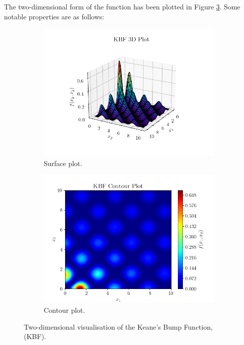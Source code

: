 \documentclass[10pt]{article}
\begin{document}
\begin{multicols}{2}
The two-dimensional form of the function has been plotted in Figure \ref{fig:KBF_2D}. Some notable properties are as follows:

\begin{figure}[H]
    \centering
    \begin{subfigure}{0.49\textwidth}
        \centering
        \includegraphics[width=\textwidth]{../figures/KBF/KBF_surf.png}
        \caption{Surface plot.}
        \label{fig:KBF_surf}
    \end{subfigure}
    \begin{subfigure}{0.46\textwidth}
        \centering
        \includegraphics[width=\textwidth]{../figures/KBF/KBF_contour.png}
        \caption{Contour plot.}
        \label{fig:KBF_contour}
    \end{subfigure}
        \captionsetup{justification=centering}
        \caption{Two-dimensional visualisation of the Keane's Bump Function, (KBF).}
        \label{fig:KBF_2D}
\end{figure}


\end{multicols}
\end{document}
